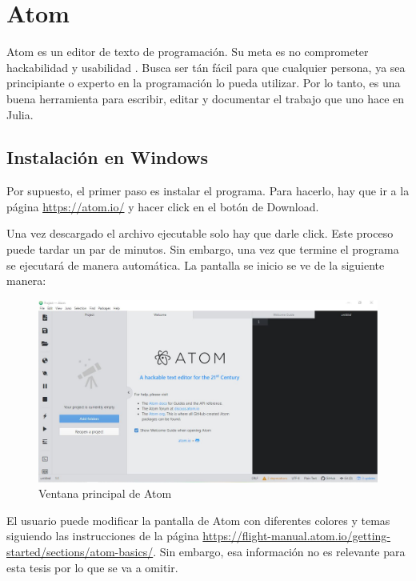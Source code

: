 \section{Atom}
Atom es un editor de texto de programación. Su meta es no comprometer hackabilidad y usabilidad  \cite{ATOM}. Busca ser tán fácil para que cualquier persona, ya sea principiante o experto en la programación lo pueda utilizar. Por lo tanto, es una buena herramienta para escribir, editar y documentar el trabajo que uno hace en Julia. 

\subsection{Instalación en Windows} 
Por supuesto, el primer paso es instalar el programa. Para hacerlo, hay que ir a la página \url{https://atom.io/} y hacer click en el botón de Download. 

Una vez descargado el archivo ejecutable solo hay que darle click. Este proceso puede tardar un par de minutos. Sin embargo, una vez que termine el programa se ejecutará de manera automática. La pantalla se inicio se ve de la siguiente manera:

\begin{figure}[h]
\begin{center}
\includegraphics[scale=0.45]{Imagenes/atom_main_window.JPG}
 \caption{Ventana principal de Atom}
  \label{main_atom}
\end{center}
\end{figure}

El usuario puede modificar la pantalla de Atom con diferentes colores y temas siguiendo las instrucciones de la página \url{https://flight-manual.atom.io/getting-started/sections/atom-basics/}. Sin embargo, esa información no es relevante para esta tesis por lo que se va a omitir. 


